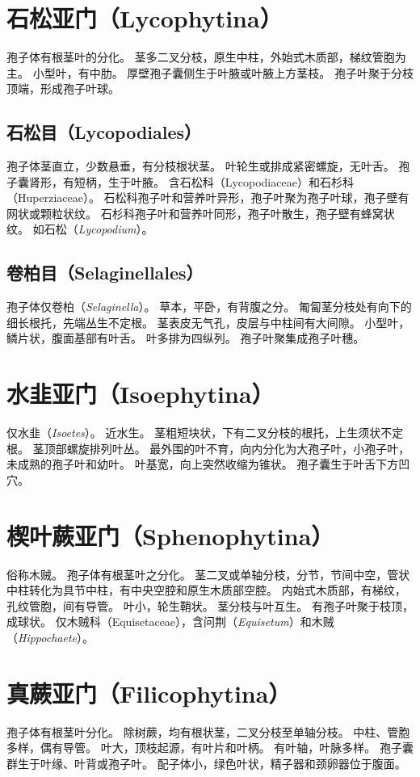 \documentclass[11pt]{article}
\begin{document}
\begin{sloppypar}
\section{石松亚门（Lycophytina）}
孢子体有根茎叶的分化。
茎多二叉分枝，原生中柱，外始式木质部，梯纹管胞为主。
小型叶，有中肋。
厚壁孢子囊侧生于叶腋或叶腋上方茎枝。
孢子叶聚于分枝顶端，形成孢子叶球。

\subsection{石松目（Lycopodiales）}
孢子体茎直立，少数悬垂，有分枝根状茎。
叶轮生或排成紧密螺旋，无叶舌。
孢子囊肾形，有短柄，生于叶腋。
含石松科（Lycopodiaceae）和石杉科（Huperziaceae）。
石松科孢子叶和营养叶异形，孢子叶聚为孢子叶球，孢子壁有网状或颗粒状纹。
石杉科孢子叶和营养叶同形，孢子叶散生，孢子壁有蜂窝状纹。
如石松（\textit{Lycopodium}）。

\subsection{卷柏目（Selaginellales）}
孢子体仅卷柏（\textit{Selaginella}）。
草本，平卧，有背腹之分。
匍匐茎分枝处有向下的细长根托，先端丛生不定根。
茎表皮无气孔，皮层与中柱间有大间隙。
小型叶，鳞片状，腹面基部有叶舌。
叶多排为四纵列。
孢子叶聚集成孢子叶穗。

\section{水韭亚门（Isoephytina）}
仅水韭（\textit{Isoetes}）。
近水生。
茎粗短块状，下有二叉分枝的根托，上生须状不定根。
茎顶部螺旋排列叶丛。
最外围的叶不育，向内分化为大孢子叶，小孢子叶，未成熟的孢子叶和幼叶。
叶基宽，向上突然收缩为锥状。
孢子囊生于叶舌下方凹穴。

\section{楔叶蕨亚门（Sphenophytina）}
俗称木贼。
孢子体有根茎叶之分化。
茎二叉或单轴分枝，分节，节间中空，管状中柱转化为具节中柱，有中央空腔和原生木质部空腔。
内始式木质部，有梯纹，孔纹管胞，间有导管。
叶小，轮生鞘状。
茎分枝与叶互生。
有孢子叶聚于枝顶，成球状。
仅木贼科（Equisetaceae），含问荆（\textit{Equisetum}）和木贼（\textit{Hippochaete}）。

\section{真蕨亚门（Filicophytina）}
孢子体有根茎叶分化。
除树蕨，均有根状茎，二叉分枝至单轴分枝。
中柱、管胞多样，偶有导管。
叶大，顶枝起源，有叶片和叶柄。
有叶轴，叶脉多样。
孢子囊群生于叶缘、叶背或孢子叶。
配子体小，绿色叶状，精子器和颈卵器位于腹面。


\end{sloppypar}
\end{document}
